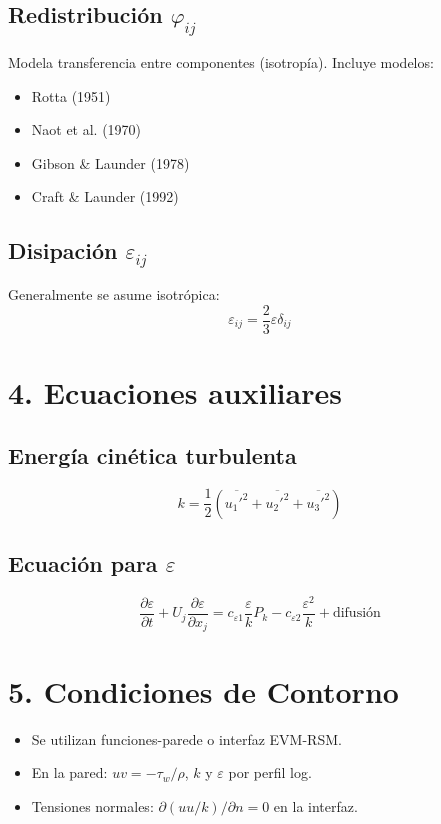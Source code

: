 \documentclass[a4paper,12pt]{article}
\begin{document}
	\subsection*{Redistribución $\varphi_{ij}$}
	Modela transferencia entre componentes (isotropía). Incluye modelos:
	\begin{itemize}
		\item Rotta (1951)
		\item Naot et al. (1970)
		\item Gibson \& Launder (1978)
		\item Craft \& Launder (1992)
	\end{itemize}
	
	\subsection*{Disipación $\varepsilon_{ij}$}
	Generalmente se asume isotrópica:
	\[
	\varepsilon_{ij} = \frac{2}{3} \varepsilon \delta_{ij}
	\]
	
	\section*{4. Ecuaciones auxiliares}
	
	\subsection*{Energía cinética turbulenta}
	\[
	k = \frac{1}{2} (\overline{u_1'^2} + \overline{u_2'^2} + \overline{u_3'^2})
	\]
	
	\subsection*{Ecuación para $\varepsilon$}
	\[
	\frac{\partial \varepsilon}{\partial t} + U_j \frac{\partial \varepsilon}{\partial x_j} =
	c_{\varepsilon1} \frac{\varepsilon}{k} P_k - c_{\varepsilon2} \frac{\varepsilon^2}{k} + \text{difusión}
	\]
	
	\section*{5. Condiciones de Contorno}
	\begin{itemize}
		\item Se utilizan funciones-parede o interfaz EVM-RSM.
		\item En la pared: $uv = -\tau_w/\rho$, $k$ y $\varepsilon$ por perfil log.
		\item Tensiones normales: $\partial (uu/k) / \partial n = 0$ en la interfaz.
	\end{itemize}
	
\end{document}
